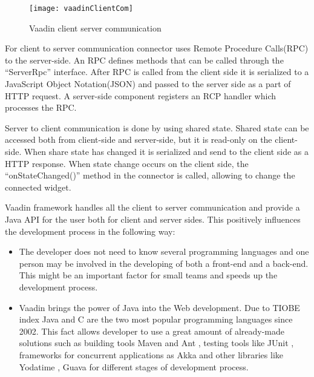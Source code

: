 	  \begin{figure}
      	\texttt{[image: vaadinClientCom]}
      	\caption{Vaadin client server communication}
      	\label{fig:vaadinClientCom}
      \end{figure}
      
   For client to server communication connector uses Remote Procedure
   Calls(RPC) to the server-side. An RPC defines methods that can be called
   through the ``ServerRpc'' interface. After RPC is called from the client side
   it is serialized to a JavaScript Object Notation(JSON) and passed to the
   server side as a part of HTTP request. A server-side component registers an
   RCP handler which processes the RPC. 
   
   Server to client communication is done by using shared
   state. Shared state can be accessed both from client-side and server-side,
   but it is read-only on the client-side. When share state has changed it is
   serialized and send to the client side as a HTTP response. When state change
   occurs on the client side, the ``onStateChanged()'' method in the connector is called,
   allowing to change the connected widget.
   
   
  
   Vaadin framework handles all the client to server communication and provide
   a Java API for the user both for client and server sides. This positively
    influences the development process in the following way:
   \begin{itemize}
     \item The developer does not need to know several programming languages and one
    person may be involved in the developing of both a front-end and a back-end.
    This might be an important factor for small teams and speeds up the development
    process.
   \item Vaadin brings the power of Java into the Web development. Due to
    TIOBE index \cite{tiobeIndex} Java and C are the two most popular programming
    languages since 2002. This fact allows developer to use a great amount of
    already-made solutions such as building tools Maven \cite{maven} and Ant
    \cite{ant}, testing tools like JUnit \cite{junit}, frameworks for concurrent
    applications as Akka \cite{akka} \cite{akkaUseCases} and other libraries
    like Yodatime \cite{yodatime}, Guava \cite{guava} for different stages of development process.
  \end{itemize}  		
		
